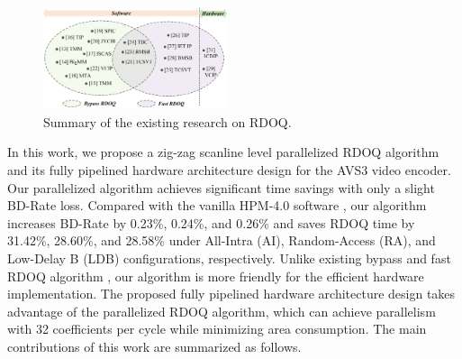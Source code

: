 \documentclass[lettersize,journal]{IEEEtran}
\begin{document}
\begin{figure}[!t]
	\centering
	\centerline{\includegraphics[width=0.48\textwidth]{figure/Summary_rdoq.png}} 
	\caption{Summary of the existing research on RDOQ.}
	\label{summary} %
\end{figure}
\par
In this work, we propose a zig-zag scanline level parallelized RDOQ algorithm and its fully pipelined hardware architecture design for the AVS3 video encoder. Our parallelized algorithm achieves significant time savings with only a slight BD-Rate loss. Compared with the vanilla HPM-4.0 software \cite{HPM4.0}, our algorithm increases BD-Rate by 0.23\%, 0.24\%, and 0.26\% and saves RDOQ time by 31.42\%, 28.60\%, and 28.58\% under All-Intra (AI), Random-Access (RA), and Low-Delay B (LDB) configurations, respectively. Unlike existing bypass and fast RDOQ algorithm \cite{lee2016all-zero, wang2017fastrdoq, fan2016hybridzreoblock, cui2018hybrid, cui2017adaptive, wei2019all, yin2018efficient, yin2020multistageallzerodetection, lee2015fastquantizationmethod, zhang2015fastrdoq, xu2018simplifiedrdoq, xu2020simplifiedLevelEstimation, huang2015efficientquantization, cui2017Laplacedistributionbased, he2015highimplementationrdoq, wang2016improvedrdoq, canh2018rate, kianfar2020parallelized}, our algorithm is more friendly for the efficient hardware implementation. 
The proposed fully pipelined hardware architecture design takes advantage of the parallelized RDOQ algorithm, which can achieve parallelism with 32 coefficients per cycle while minimizing area consumption. 
The main contributions of this work are summarized as follows. 
\end{document}
